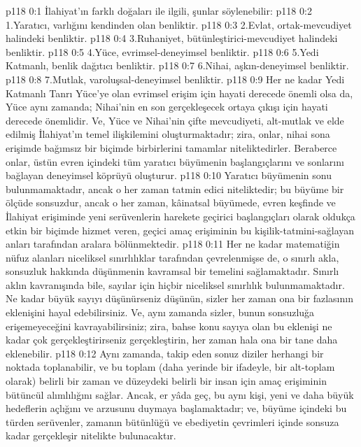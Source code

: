 \vs p118 0:1 İlahiyat’ın farklı doğaları ile ilgili, şunlar söylenebilir:
\vs p118 0:2 1.\bibnobreakspace Yaratıcı, varlığını kendinden olan benliktir.
\vs p118 0:3 2.\bibnobreakspace Evlat, ortak\hyp{}mevcudiyet halindeki benliktir.
\vs p118 0:4 3.\bibnobreakspace Ruhaniyet, bütünleştirici\hyp{}mevcudiyet halindeki benliktir.
\vs p118 0:5 4.\bibnobreakspace Yüce, evrimsel\hyp{}deneyimsel benliktir.
\vs p118 0:6 5.\bibnobreakspace Yedi Katmanlı, benlik dağıtıcı benliktir.
\vs p118 0:7 6.\bibnobreakspace Nihai, aşkın\hyp{}deneyimsel benliktir.
\vs p118 0:8 7.\bibnobreakspace Mutlak, varoluşsal\hyp{}deneyimsel benliktir.
\vs p118 0:9 Her ne kadar Yedi Katmanlı Tanrı Yüce’ye olan evrimsel erişim için hayati derecede önemli olsa da, Yüce aynı zamanda; Nihai’nin en son gerçekleşecek ortaya çıkışı için hayati derecede önemlidir. Ve, Yüce ve Nihai’nin çifte mevcudiyeti, alt\hyp{}mutlak ve elde edilmiş İlahiyat’ın temel ilişkilemini oluşturmaktadır; zira, onlar, nihai sona erişimde bağımsız bir biçimde birbirlerini tamamlar niteliktedirler. Beraberce onlar, üstün evren içindeki tüm yaratıcı büyümenin başlangıçlarını ve sonlarını bağlayan deneyimsel köprüyü oluşturur.
\vs p118 0:10 Yaratıcı büyümenin sonu bulunmamaktadır, ancak o her zaman tatmin edici niteliktedir; bu büyüme bir ölçüde sonsuzdur, ancak o her zaman, kâinatsal büyümede, evren keşfinde ve İlahiyat erişiminde yeni serüvenlerin harekete geçirici başlangıçları olarak oldukça etkin bir biçimde hizmet veren, geçici amaç erişiminin bu kişilik\hyp{}tatmini\hyp{}sağlayan anları tarafından aralara bölünmektedir.
\vs p118 0:11 Her ne kadar matematiğin nüfuz alanları niceliksel sınırlılıklar tarafından çevrelenmişse de, o sınırlı akla, sonsuzluk hakkında düşünmenin kavramsal bir temelini sağlamaktadır. Sınırlı aklın kavranışında bile, sayılar için hiçbir niceliksel sınırlılık bulunmamaktadır. Ne kadar büyük sayıyı düşünürseniz düşünün, sizler her zaman ona bir fazlasının eklenişini hayal edebilirsiniz. Ve, aynı zamanda sizler, bunun sonsuzluğa erişemeyeceğini kavrayabilirsiniz; zira, bahse konu sayıya olan bu eklenişi ne kadar çok gerçekleştirirseniz gerçekleştirin, her zaman hala ona bir tane daha eklenebilir.
\vs p118 0:12 Aynı zamanda, takip eden sonuz diziler herhangi bir noktada toplanabilir, ve bu toplam (daha yerinde bir ifadeyle, bir alt\hyp{}toplam olarak) belirli bir zaman ve düzeydeki belirli bir insan için amaç erişiminin bütüncül alımlılığını sağlar. Ancak, er yâda geç, bu aynı kişi, yeni ve daha büyük hedeflerin açlığını ve arzusunu duymaya başlamaktadır; ve, büyüme içindeki bu türden serüvenler, zamanın bütünlüğü ve ebediyetin çevrimleri içinde sonsuza kadar gerçekleşir nitelikte bulunacaktır.
